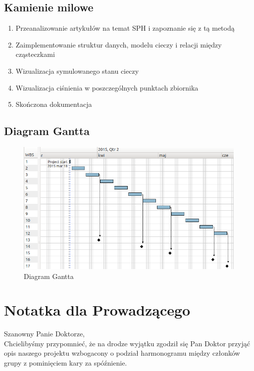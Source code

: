 \documentclass[a4paper]{article}
\begin{document}
\subsection{Kamienie milowe}
\begin{enumerate}[label=K\arabic*{.}]
    \item Przeanalizowanie artykułów na temat SPH i zapoznanie się z tą metodą
    \item Zaimplementowanie struktur danych, modelu cieczy i relacji między cząsteczkami
    \item Wizualizacja symulowanego stanu cieczy
    \item Wizualizacja ciśnienia w poszczególnych punktach zbiornika
    \item Skończona dokumentacja
\end{enumerate}

\newpage
\subsection{Diagram Gantta}
\begin{figure}[h] %
    \begin{center}
        \includegraphics[width=\textwidth]{./rysunki/gantt.png}
    \end{center}
    \caption{Diagram Gantta}
    \label{fig:gantt}
\end{figure}

\section{Notatka dla Prowadzącego}
Szanowny Panie Doktorze, \\
Chcielibyśmy przypomnieć, że na drodze wyjątku zgodził się Pan Doktor przyjąć opis naszego projektu wzbogacony o podział harmonogramu między członków grupy z pominięciem kary za spóźnienie.
\end{document}
